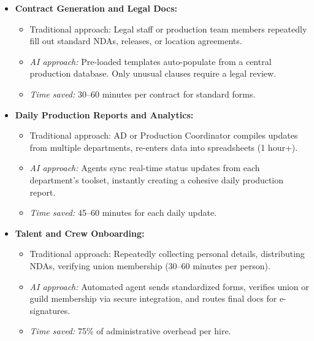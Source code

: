 \documentclass[11pt]{article}
\begin{document}
\begin{itemize}
    \item \textbf{Contract Generation and Legal Docs:}
    \begin{itemize}
        \item Traditional approach: Legal staff or production team members repeatedly fill out standard NDAs, releases, or location agreements.
        \item \emph{AI approach:} Pre-loaded templates auto-populate from a central production database. Only unusual clauses require a legal review.
        \item \emph{Time saved:} 30--60 minutes per contract for standard forms.
    \end{itemize}

    \item \textbf{Daily Production Reports and Analytics:}
    \begin{itemize}
        \item Traditional approach: AD or Production Coordinator compiles updates from multiple departments, re-enters data into spreadsheets (1 hour+).
        \item \emph{AI approach:} Agents sync real-time status updates from each department’s toolset, instantly creating a cohesive daily production report.
        \item \emph{Time saved:} 45--60 minutes for each daily update.
    \end{itemize}

    \item \textbf{Talent and Crew Onboarding:}
    \begin{itemize}
        \item Traditional approach: Repeatedly collecting personal details, distributing NDAs, verifying union membership (30--60 minutes per person).
        \item \emph{AI approach:} Automated agent sends standardized forms, verifies union or guild membership via secure integration, and routes final docs for e-signatures.
        \item \emph{Time saved:} 75\% of administrative overhead per hire.
    \end{itemize}
\end{itemize}
\end{document}
